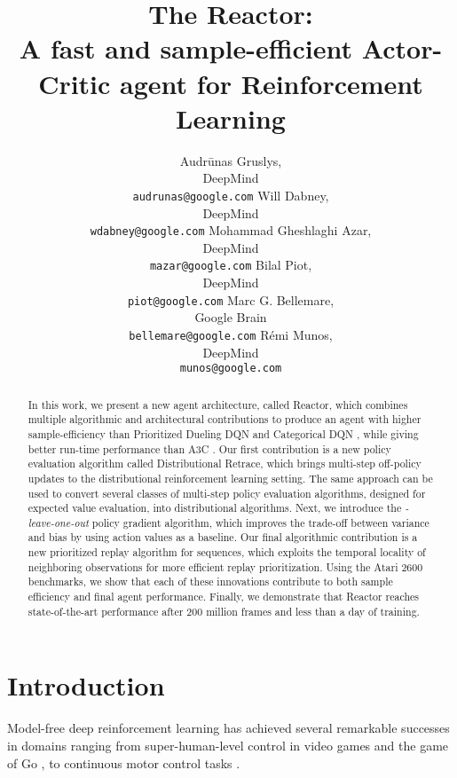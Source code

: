\documentclass{article}
\title{The Reactor: \\ A fast and sample-efficient Actor-Critic agent for 
Reinforcement Learning}
\author{Audr{\=u}nas Gruslys, \\ DeepMind \\ \texttt{audrunas@google.com}
\And
Will Dabney, \\ DeepMind \\ \texttt{wdabney@google.com}
\And
Mohammad Gheshlaghi Azar, \\ DeepMind\\ \texttt{mazar@google.com}
\And
Bilal Piot, \\ DeepMind \\ \texttt{piot@google.com}
\And
Marc G. Bellemare, \\ Google Brain \\ \texttt{bellemare@google.com}
\And
R{\'e}mi Munos, \\ DeepMind \\ \texttt{munos@google.com}
}
\begin{document}
 

\maketitle

\begin{abstract}
In this work, we present a new agent architecture, called Reactor, which 
combines multiple algorithmic and architectural contributions to produce 
an agent with higher sample-efficiency than Prioritized Dueling DQN 
\citep{wang2017sample} and Categorical DQN \citep{bellemare2017distributional}, 
while giving better run-time performance than A3C \citep{mnih2016asynchronous}. 
Our first contribution is a new policy evaluation algorithm called Distributional 
Retrace, which brings multi-step off-policy updates to the 
distributional reinforcement learning setting. 
The same approach can be used to convert several classes of 
multi-step policy evaluation algorithms, designed for expected value evaluation, 
into distributional algorithms. Next, we introduce the {\em -leave-one-out} 
policy gradient algorithm, which improves the trade-off between variance 
and bias by using action values as a baseline. Our final algorithmic contribution is 
a new prioritized replay algorithm for sequences, which exploits the temporal locality of 
neighboring observations for more efficient replay prioritization. 
Using the Atari 2600 benchmarks, we show that each of these innovations contribute to 
both sample efficiency and final agent performance. Finally, we demonstrate that Reactor 
reaches state-of-the-art performance after 200 million frames and less than a day of training.
\end{abstract} 

\section{Introduction}
\label{introduction}

Model-free deep reinforcement learning has achieved several remarkable 
successes in domains ranging from super-human-level control in video games 
\citep{mnih15human} and the game of Go \citep{silver2016mastering, agzero}, to 
continuous motor control tasks \citep{lillicrap2015continuous,schulman2015trust}.
\end{document}
